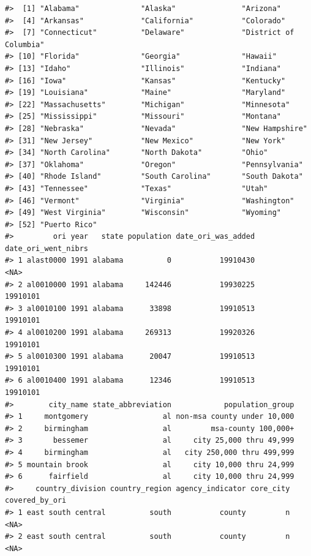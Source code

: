 \documentclass[
]{krantz}
\begin{document}
\begin{verbatim}
#>  [1] "Alabama"              "Alaska"               "Arizona"             
#>  [4] "Arkansas"             "California"           "Colorado"            
#>  [7] "Connecticut"          "Delaware"             "District of Columbia"
#> [10] "Florida"              "Georgia"              "Hawaii"              
#> [13] "Idaho"                "Illinois"             "Indiana"             
#> [16] "Iowa"                 "Kansas"               "Kentucky"            
#> [19] "Louisiana"            "Maine"                "Maryland"            
#> [22] "Massachusetts"        "Michigan"             "Minnesota"           
#> [25] "Mississippi"          "Missouri"             "Montana"             
#> [28] "Nebraska"             "Nevada"               "New Hampshire"       
#> [31] "New Jersey"           "New Mexico"           "New York"            
#> [34] "North Carolina"       "North Dakota"         "Ohio"                
#> [37] "Oklahoma"             "Oregon"               "Pennsylvania"        
#> [40] "Rhode Island"         "South Carolina"       "South Dakota"        
#> [43] "Tennessee"            "Texas"                "Utah"                
#> [46] "Vermont"              "Virginia"             "Washington"          
#> [49] "West Virginia"        "Wisconsin"            "Wyoming"             
#> [52] "Puerto Rico"
#>         ori year   state population date_ori_was_added date_ori_went_nibrs
#> 1 alast0000 1991 alabama          0           19910430                <NA>
#> 2 al0010000 1991 alabama     142446           19930225            19910101
#> 3 al0010100 1991 alabama      33898           19910513            19910101
#> 4 al0010200 1991 alabama     269313           19920326            19910101
#> 5 al0010300 1991 alabama      20047           19910513            19910101
#> 6 al0010400 1991 alabama      12346           19910513            19910101
#>        city_name state_abbreviation            population_group
#> 1     montgomery                 al non-msa county under 10,000
#> 2     birmingham                 al         msa-county 100,000+
#> 3       bessemer                 al     city 25,000 thru 49,999
#> 4     birmingham                 al   city 250,000 thru 499,999
#> 5 mountain brook                 al     city 10,000 thru 24,999
#> 6      fairfield                 al     city 10,000 thru 24,999
#>     country_division country_region agency_indicator core_city covered_by_ori
#> 1 east south central          south           county         n           <NA>
#> 2 east south central          south           county         n           <NA>

\end{verbatim}
\end{document}
